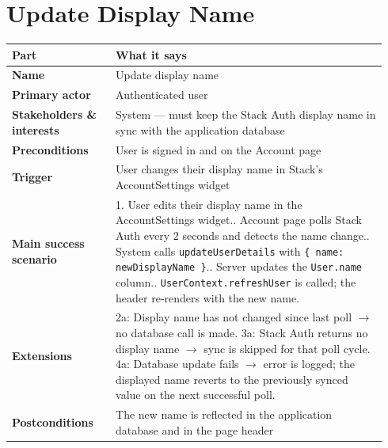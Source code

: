 \documentclass[11pt,twocolumn]{article}
\newcommand{\ucheader}{%
\textbf{Part} & \textbf{What it says} \\
\hline
\endhead
\hline
\endfoot
}
\begin{document}
\section{Update Display Name}
{\footnotesize
\begin{longtable}{@{}p{0.26\linewidth}p{0.68\linewidth}@{}}
\hline
\ucheader
\textbf{Name} & Update display name \\
\hline
\textbf{Primary actor} & Authenticated user \\
\hline
\textbf{Stakeholders \& interests} & System --- must keep the Stack Auth display name in sync with the application database \\
\hline
\textbf{Preconditions} & User is signed in and on the Account page \\
\hline
\textbf{Trigger} & User changes their display name in Stack's AccountSettings widget \\
\hline
\textbf{Main success scenario} & 1. User edits their display name in the AccountSettings widget.\newline
2. Account page polls Stack Auth every 2 seconds and detects the name change.\newline
3. System calls \texttt{updateUserDetails} with \texttt{\{ name: newDisplayName \}}.\newline
4. Server updates the \texttt{User.name} column.\newline
5. \texttt{UserContext.refreshUser} is called; the header re-renders with the new name. \\
\hline
\textbf{Extensions} & 2a: Display name has not changed since last poll $\rightarrow$ no database call is made.\newline
3a: Stack Auth returns no display name $\rightarrow$ sync is skipped for that poll cycle.\newline
4a: Database update fails $\rightarrow$ error is logged; the displayed name reverts to the previously synced value on the next successful poll. \\
\hline
\textbf{Postconditions} & The new name is reflected in the application database and in the page header \\
\hline
\end{longtable}
}
\end{document}
